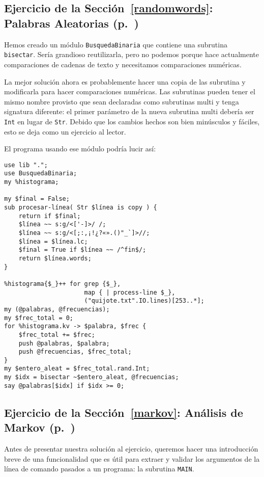 \subsection{Ejercicio de la Sección~\ref{randomwords}: Palabras Aleatorias (p.~\pageref{randhist})}
\label{sol_randhist}

Hemos creado un módulo {\tt BusquedaBinaria} que contiene una
subrutina {\tt bisectar}. Sería grandioso reutilizarla, pero no
podemos porque hace actualmente comparaciones de cadenas de texto
y necesitamos comparaciones numéricas.

La mejor solución ahora es probablemente hacer una copia de
las subrutina y modificarla para hacer comparaciones numéricas.
Las subrutinas pueden tener el mismo nombre provisto que sean
declaradas como subrutinas multi y tenga signatura diferente:
el primer parámetro de la nueva subrutina multi debería ser {\tt Int}
en lugar de {\tt Str}. Debido que los cambios hechos son bien 
minúsculos y fáciles, esto se deja como un ejercicio al lector.

El programa usando ese módulo podría lucir así:

\begin{verbatim}
use lib ".";
use BusquedaBinaria;
my %histograma;

my $final = False;
sub procesar-línea( Str $línea is copy ) {
    return if $final;
    $línea ~~ s:g/<['-]>/ /;
    $línea ~~ s:g/<[;:,¡!¿?«».()"_`]>//;
    $línea = $línea.lc;
    $final = True if $línea ~~ /^fin$/;
    return $línea.words;
}

%histograma{$_}++ for grep {$_},
                      map { | process-line $_}, 
                      ("quijote.txt".IO.lines)[253..*]; 
my (@palabras, @frecuencias);
my $frec_total = 0;
for %histograma.kv -> $palabra, $frec {
    $frec_total += $frec;
    push @palabras, $palabra;
    push @frecuencias, $frec_total;
}
my $entero_aleat = $frec_total.rand.Int;
my $idx = bisectar ~$entero_aleat, @frecuencias;
say @palabras[$idx] if $idx >= 0;
\end{verbatim}

\subsection{Ejercicio de la Sección~\ref{markov}: Análisis de Markov (p.~\pageref{markov_analysis})}
\label{sol_markov_analysis}

Antes de presentar nuestra solución al ejercicio, queremos 
hacer una introducción breve de una funcionalidad que es
útil para extraer y validar los argumentos de la línea de comando
pasados a un programa: la subrutina {\tt MAIN}.

